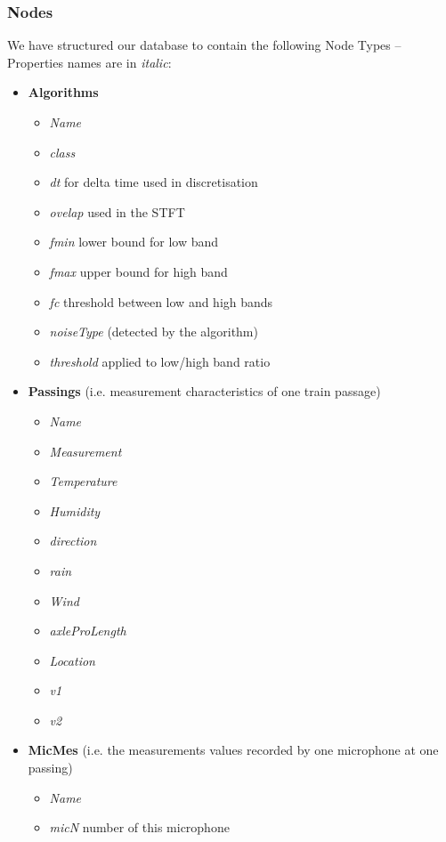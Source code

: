 \documentclass{article}\usepackage[]{graphicx}\usepackage[]{color}
\begin{document}
\subsubsection{Nodes}
We have structured our database to contain the following Node Types -- Properties names are in {\it italic}:

\begin{itemize}
\item {\bf Algorithms}
  \begin{itemize}
    \item {\it Name}
    \item {\it class}
    \item {\it dt} for delta time used in discretisation
    \item {\it ovelap} used in the STFT
    \item {\it fmin} lower bound for low band
    \item {\it fmax} upper bound for high band
    \item {\it fc} threshold between low and high bands
    \item {\it noiseType} (detected by the algorithm)
    \item {\it threshold} applied to low/high band ratio
  \end{itemize}
\item {\bf Passings} (i.e. measurement characteristics of one train passage)
  \begin{itemize}
    \item {\it Name}
    \item {\it Measurement}
    \item {\it Temperature}
    \item {\it Humidity}
    \item {\it direction}
    \item {\it rain}
    \item {\it Wind}
    \item {\it axleProLength}
    \item {\it Location}
    \item {\it v1}
    \item {\it v2}
  \end{itemize}
\item {\bf MicMes} (i.e. the measurements values recorded by one microphone at one passing)
  \begin{itemize}
    \item {\it Name}
    \item {\it micN} number of this microphone    

\end{itemize}
\end{itemize}
\end{document}
